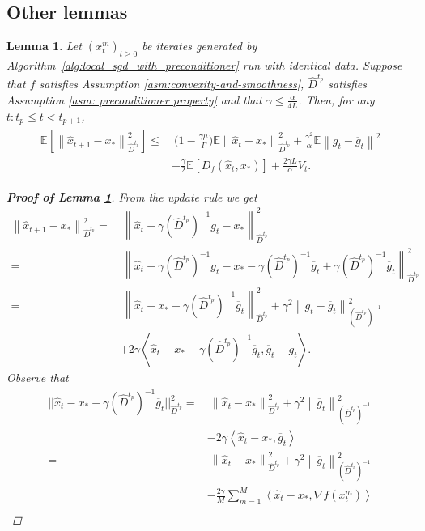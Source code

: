 \documentclass[sn-mathphys,Numbered]{sn-jnl}%
\newtheorem{lemma}{Lemma}%
\newcommand*{\E}{{\mathbb E}}
\renewcommand{\|}{\parallel}
\newcommand\ec[2][]{\ensuremath{\mathbb{E}_{#1} \left[#2\right]}}
\newcommand\ecn[3][]{\ec[#1]{\norm{#2}^2_{#3}}}
\newcommand\ev[1]{\left \langle #1 \right \rangle}
\newcommand{\norm}[1]{\left\lVert#1\right\rVert}
\newcommand{\sqn}[1]{{\left\lVert#1\right\rVert}^2}
\renewcommand {\*} {\ast}
\begin{document}
\subsection{\bf Other lemmas}
\begin{lemma}
     \label{lemma:iterate-one-recursion}
     Let $(x_t^m)_{t \geq 0}$ be iterates generated by Algorithm~\ref{alg:local_sgd_with_preconditioner} run with identical data. Suppose that $f$ satisfies Assumption \ref{asm:convexity-and-smoothness}, $\hat{D}^{t_p}$ satisfies Assumption \ref{asm: preconditioner property} and that $\gamma \leq \frac{\alpha}{4L}$. Then, for any $t:t_p \leq t < t_{p+1}$,
     \begin{align}
         \begin{split}
             \ecn{\hat{x}_{t+1} - x_\ast}{\hat{D}^{t_p}} \leq&\ \Big(1-\frac{\gamma\mu}{\Gamma}\Big) \E \sqn{\hat{x}_t-x_\ast}_{\hat{D}^{t_p}} + \frac{\gamma^2}{\alpha}  \E \sqn{g_t - \overline{g}_t} \nonumber \\ &- \frac{\gamma}{2} \ec{D_{f} (\hat{x}_t, x_\ast)} +  \frac{2 \gamma L}{\alpha} V_t.
         \end{split}
     \end{align}
\begin{proof}[\bf Proof of Lemma \ref{lemma:iterate-one-recursion}]
From the update rule we get
\begin{align}
\sqn{\hat{x}_{t+1}-x_\ast}_{\hat{D}^{t_p}} =&\ \sqn{\hat{x}_t - \gamma (\hat{D}^{t_p})^{-1} g_t -x_\ast }_{\hat{D}^{t_p}} \nonumber \\ =&\ \sqn{\hat{x}_t - \gamma (\hat{D}^{t_p})^{-1}g_t -x_\ast - \gamma (\hat{D}^{t_p})^{-1}\overline{g}_t + \gamma (\hat{D}^{t_p})^{-1} \overline{g}_t }_{\hat{D}^{t_p}} \nonumber \\
 =&\ \sqn{\hat{x}_t-x_\ast - \gamma (\hat{D}^{t_p})^{-1} \overline{g}_t}_{\hat{D}^{t_p}} + \gamma^2 \sqn{g_t - \overline{g}_t}_{(\hat{D}^{t_p})^{-1}} \nonumber \\ &+ 2\gamma \ev{\hat{x}_t-x_\ast - \gamma(\hat{D}^{t_p})^{-1}\overline{g}_t, \overline{g}_t-g_t}. 
\end{align}
Observe that
\begin{align}
     ||\hat{x}_t-x_\ast - \gamma(\hat{D}^{t_p})^{-1} \overline{g}_t  ||^2_{\hat{D}^{t_p}} \nonumber =&\ \sqn{\hat{x}_t-x_\ast}_{\hat{D}^{t_p}} + \gamma^2 \sqn{\overline{g}_t}_{(\hat{D}^{t_p})^{-1}} \nonumber \\&- 2 \gamma \ev{\hat{x}_t-x_\ast, \overline{g}_t} \nonumber \\
    =&\ \sqn{\hat{x}_t-x_\ast}_{\hat{D}^{t_p}} + \gamma^2  \sqn{\overline{g}_t}_{(\hat{D}^{t_p})^{-1}} \nonumber \\ &-  \frac{2\gamma}{M} \sum_{m=1}^M \ev{\hat{x}_t-x_\ast, \nabla f(x_t^m)} \nonumber \\

\end{align}
\end{proof}
\end{lemma}
\end{document}
